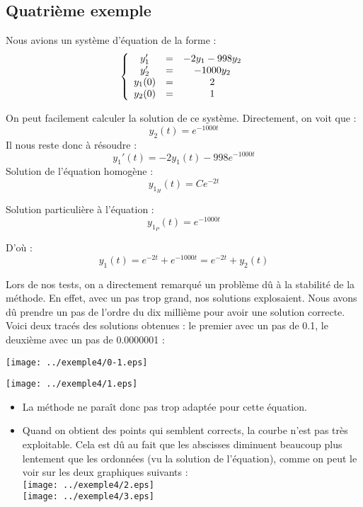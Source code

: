 \subsection{Quatrième exemple}

Nous avions un système d'équation de la forme :
\[\left\{ \begin{array}{c c c}
y_1' &=& -2y_1 - 998 y_2\\
y_2' &=& -1000y_2\\
y_1(0) &=& 2\\
y_2(0) &=& 1
\end{array}\right.\]

On peut facilement calculer la solution de ce système.
Directement, on voit que :
\[y_2(t)=e^{-1000t}\]
Il nous reste donc à résoudre :
\[y_1'(t)=-2y_1(t)-998e^{-1000t}\]
Solution de l'équation homogène :
\[y_{1_H}(t)=Ce^{-2t}\]

Solution particulière à l'équation :
\[y_{1_P}(t)=e^{-1000t}\]

D'où :
\[y_1(t)=e^{-2t}+e^{-1000t}=e^{-2t}+y_2(t)\]

Lors de nos tests, on a directement remarqué un problème dû à la stabilité de la méthode. En effet, avec un pas trop grand, nos solutions explosaient. Nous avons dû prendre un pas de l'ordre du dix millième pour avoir une solution correcte. Voici deux tracés des solutions obtenues : le premier avec un pas de 0.1, le deuxième avec un pas de 0.0000001 :

\begin{center}
\texttt{[image: ../exemple4/0-1.eps]}
\end{center}

\begin{center}
\texttt{[image: ../exemple4/1.eps]}
\end{center}

\begin{itemize}
	\item La méthode ne paraît donc pas trop adaptée pour cette équation.
	\item Quand on obtient des points qui semblent corrects, la courbe n'est pas très exploitable. Cela est dû au fait que les abscisses diminuent beaucoup plus lentement que les ordonnées (vu la solution de l'équation), comme on peut le voir sur les deux graphiques suivants :\\
		\texttt{[image: ../exemple4/2.eps]}\\
		\texttt{[image: ../exemple4/3.eps]}
\end{itemize}
